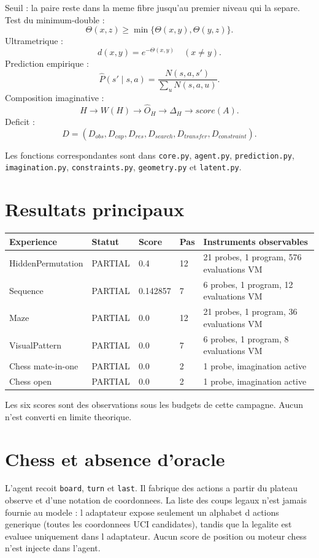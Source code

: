 \documentclass[11pt,a4paper]{article}
\begin{document}
Seuil : la paire reste dans la meme fibre jusqu'au premier niveau qui la separe. Test du minimum-double :
\[
\Theta(x,z)\ge \min\{\Theta(x,y),\Theta(y,z)\}.
\]
Ultrametrique :
\[
d(x,y)=e^{-\Theta(x,y)}\quad(x\neq y).
\]
Prediction empirique :
\[
\widehat P(s'\mid s,a)=\frac{N(s,a,s')}{\sum_u N(s,a,u)}.
\]
Composition imaginative :
\[
H\to W(H)\to\widehat O_H\to\Delta_H\to score(A).
\]
Deficit :
\[
D=(D_{obs},D_{cap},D_{res},D_{search},D_{transfer},D_{constraint}).
\]

Les fonctions correspondantes sont dans \texttt{core.py}, \texttt{agent.py}, \texttt{prediction.py}, \texttt{imagination.py}, \texttt{constraints.py}, \texttt{geometry.py} et \texttt{latent.py}.

\section{Resultats principaux}
\begin{longtable}{p{3.7cm}p{2cm}p{2cm}p{1.4cm}p{4.5cm}}
\toprule
Experience & Statut & Score & Pas & Instruments observables \\
\midrule
HiddenPermutation & PARTIAL & 0.4 & 12 & 21 probes, 1 program, 576 evaluations VM \\
Sequence & PARTIAL & 0.142857 & 7 & 6 probes, 1 program, 12 evaluations VM \\
Maze & PARTIAL & 0.0 & 12 & 21 probes, 1 program, 36 evaluations VM \\
VisualPattern & PARTIAL & 0.0 & 7 & 6 probes, 1 program, 8 evaluations VM \\
Chess mate-in-one & PARTIAL & 0.0 & 2 & 1 probe, imagination active \\
Chess open & PARTIAL & 0.0 & 2 & 1 probe, imagination active \\
\bottomrule
\end{longtable}

Les six scores sont des observations sous les budgets de cette campagne. Aucun n'est converti en limite theorique.

\section{Chess et absence d'oracle}
L'agent recoit \texttt{board}, \texttt{turn} et \texttt{last}. Il fabrique des actions a partir du plateau observe et d'une notation de coordonnees. La liste des coups legaux n'est jamais fournie au modele : l adaptateur expose seulement un alphabet d actions generique (toutes les coordonnees UCI candidates), tandis que la legalite est evaluee uniquement dans l adaptateur. Aucun score de position ou moteur chess n'est injecte dans l'agent.
\end{document}
